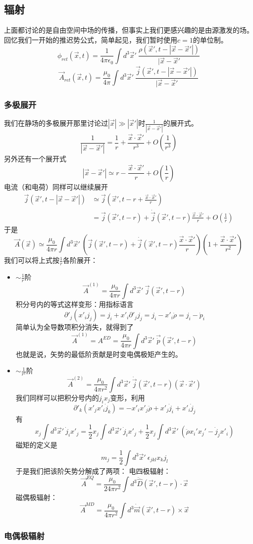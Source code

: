 \documentclass[a4paper,11pt]{ctexart}
\newcommand{\beq}{\begin{equation}}
\newcommand{\eeq}{\end{equation}}
\newcommand{\bea}{\begin{equation}\begin{aligned}}
\newcommand{\eea}{\end{aligned}\end{equation}}
\newcommand{\epv}{\epsilon_0}
\begin{document}
\subsection{辐射}
上面都讨论的是自由空间中场的传播，但事实上我们更感兴趣的是由源激发的场。回忆我们一开始的推迟势公式，简单起见，我们暂时使用$c=1$的单位制。
\beq
\phi_{ret}( \vec x, t) = \frac{1}{4\pi \epv}\int d^3 \vec{x}'\ \frac{\rho(\vec x', t - |\vec x - \vec{x}'|)}{|\vec x - \vec{x}'}
\eeq
\beq
\vec A_{ret}( \vec x, t) = \frac{\mu_0}{4\pi}\int d^3 \vec{x}'\ \frac{\vec j(\vec x', t - |\vec x - \vec{x}'|)}{|\vec x - \vec{x}'}
\eeq
\subsubsection{多极展开}
我们在静场的多极展开那里讨论过$|\vec x| \gg | \vec x'|$时$\frac{1}{|\vec x - \vec{x}'|}$的展开式。
\beq
\frac{1}{|\vec x - \vec{x}'|} =\frac{1}{r} + \frac{\vec x\cdot \vec x' }{r^3} + O(\frac{1}{r^3})
 \eeq
另外还有一个展开式
\beq
|\vec x - \vec{x}'| \simeq r - \frac{\vec x \cdot \vec x'}{r}+ O(\frac{1}{r})
\eeq
电流（和电荷）同样可以继续展开
\bea
\vec j ( \vec x', t - |\vec x - \vec{x}'| ) &\simeq \vec j(\vec x', t - r + \frac{\vec x \cdot \vec x'}{r}) \\
&= \vec j (\vec x', t - r) + \dot{\vec j} (\vec x', t - r) \frac{\vec x \cdot \vec x'}{r} + O(\frac{1}{r})
\eea
于是
\beq
\vec A (\vec x) \simeq \frac{\mu_0}{4\pi r} \int  d^3 \vec x'\ \left( \vec j (\vec x', t - r) + \dot{\vec j} (\vec x', t - r) \frac{\vec x \cdot \vec x'}{r} \right) \left(1 + \frac{\vec x\cdot \vec x' }{r^2} \right)
\eeq
我们可以将上式按$\frac{1}{r}$各阶展开：
\begin{itemize}
\item $\sim \frac{1}{r}$阶
\beq
\vec A^{(1)}  = \frac{\mu_0}{4\pi r} \int d^3 \vec x'\ \vec j (\vec x', t - r)
\eeq
积分号内的等式这样变形：用指标语言
\beq
\partial'_j (x'_i j_j) = j_i + x'_i \partial'_j j_j = j_i - x'_i \dot \rho = j_i - \dot{p}_i
\eeq
简单认为全导数项积分消失，就得到了
\beq
\vec A^{(1)}  = A^{ED} = \frac{\mu_0}{4\pi r} \int d^3 \vec x'\ \vec \dot{p} (\vec x', t - r)
\eeq
也就是说，矢势的最低阶贡献是时变电偶极矩产生的。
\item $\sim \frac{1}{r^2}$阶
\beq
\vec A^{(2)} = \frac{\mu_0}{4\pi r^2} \int d^3 \vec x'\ \dot{\vec j} ( \vec x',t - r) (\vec x \cdot \vec x')
\eeq
我们同样可以把积分号内的$\dot{j}_i x_j$变形，利用
\beq
\partial'_k (x'_j x'_i \dot{j}_k) = -x'_i x'_j \ddot \rho + x'_j \dot{j}_i + x'_i \dot{j}_j
\eeq
有
\beq
 x_j   \int d^3 \vec x'\ \dot{j}_i x'_j = \frac{1}{2} x_j  \int d^3 \vec x'\ \dot j_i x'_j  + \frac{1}{2} x_j \int d^3 \vec x'\ (\ddot{\rho} x_i' x_j'  - \dot j_j x'_i)
\eeq
磁矩的定义是
\beq
m_j = \frac{1}{2} \int d^3 \vec x' \ \epsilon_{jkl} x_k j_l
\eeq
于是我们把该阶矢势分解成了两项：
电四极辐射：
\beq
\vec A^{EQ} = \frac{\mu_0}{24\pi r^2} \int d^3\ddot{\hat D} (\vec x', t-r) \cdot \vec x
\eeq
磁偶极辐射：
\beq
\vec A^{MD} = \frac{\mu_0}{4\pi r^2} \int d^3 \dot{\vec m}  (\vec x', t-r) \times \vec x
\eeq


\end{itemize}

\subsubsection{电偶极辐射}
\end{document}
